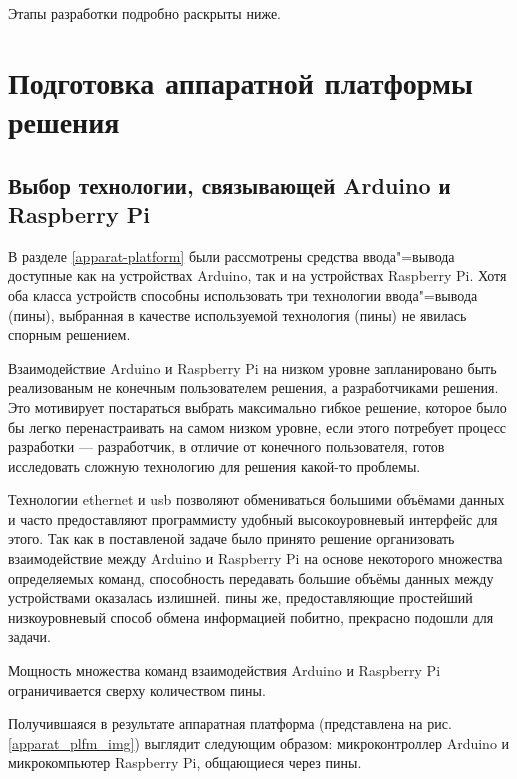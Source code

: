 \noindent 
Этапы разработки подробно раскрыты ниже.

\section{Подготовка аппаратной платформы решения}
\subsection{Выбор технологии, связывающей Arduino и Raspberry Pi}
В разделе \ref{apparat-platform} были рассмотрены средства ввода"=вывода доступные как на устройствах Arduino, так и на устройствах Raspberry Pi.
Хотя оба класса устройств способны использовать три технологии ввода"=вывода (пины), выбранная в качестве используемой технология (пины) не явилась спорным решением.

Взаимодействие Arduino и Raspberry Pi на низком уровне запланировано быть реализованым не конечным пользователем решения, а разработчиками решения. Это мотивирует постараться выбрать максимально гибкое решение, которое было бы легко перенастраивать на самом низком уровне, если этого потребует процесс разработки --- разработчик, в отличие от конечного пользователя, готов исследовать сложную технологию для решения какой-то проблемы. 

Технологии ethernet и usb позволяют обмениваться большими объёмами данных и часто предоставляют программисту удобный высокоуровневый интерфейс для этого. Так как в поставленой задаче было принято решение организовать взаимодействие между Arduino и Raspberry Pi на основе некоторого множества определяемых команд, способность передавать большие объёмы данных между устройствами оказалась излишней. пины же, предоставляющие простейший низкоуровневый способ обмена информацией побитно, прекрасно подошли для задачи.

Мощность множества команд взаимодействия Arduino и Raspberry Pi ограничивается сверху количеством пины.

Получившаяся в результате аппаратная платформа (представлена на рис. \ref{apparat_plfm_img}) выглядит следующим образом: микроконтроллер Arduino и микрокомпьютер Raspberry Pi, общающиеся через пины.

